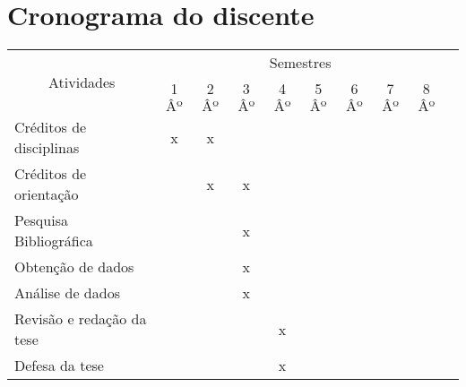 \documentclass[12pt,a4paper,oneside]{book}
\begin{document}
\chapter{Cronograma do discente}
\begin{center}
    \begin{tabular}{|l|c|c|c|c|c|c|c|c|c|}
        \hline
        \multicolumn{1}{|c|}{\multirow{2}{*}{Atividades}} &
        \multicolumn{8}{c|}{Semestres} \\ \cline{2-9}
         & 1$Âº$ & 2$Âº$ & 3$Âº$ & 4$Âº$ & 5$Âº$ & 6$Âº$ & 7$Âº$ & 8$Âº$ \\ \hline
        Cr\'{e}ditos de disciplinas & x & x & & & & & & \\ \hline
        Cr\'{e}ditos de orienta\c{c}\~ao & & x & x & & & & & \\ \hline
        Pesquisa Bibliogr\'{a}fica & & & x & & & & & \\ \hline
        Obten\c{c}\~ao de dados & & & x & &  & & & \\ \hline
        An\'{a}lise de dados & & & x & & & & & \\ \hline
        Revis\~{a}o e reda\c{c}\~ao da tese & & & & x & & & & \\ \hline
        Defesa da tese & & & & x & & & & \\ \hline
    \end{tabular}
\end{center}
\pagebreak
\medskip
\printbibliography[heading=bibintoc,title={Refer\^{e}ncias},type=article]
\backmatter
\end{document}
